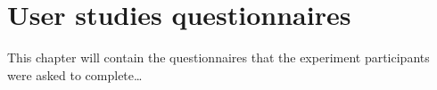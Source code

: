 \chapter{User studies questionnaires}

This chapter will contain the questionnaires that the experiment participants were asked to complete\ldots

\nlipsum
